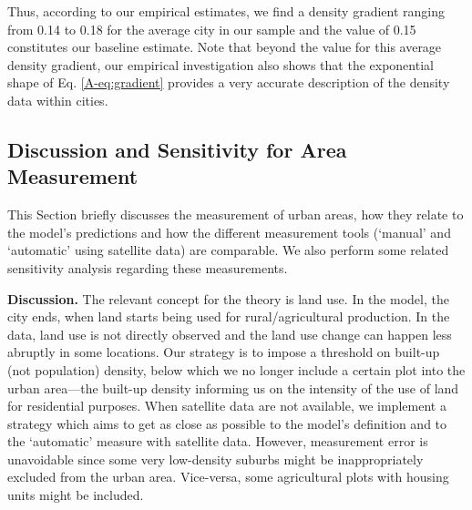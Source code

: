 \documentclass[11pt]{report}
\begin{document}

Thus, according to our empirical estimates, we find a density gradient ranging from 0.14 to 0.18 for the average city in our sample and the value of 0.15 constitutes our baseline estimate. Note that beyond the value for this average density gradient, our empirical investigation also shows that the exponential shape of Eq. \ref{A-eq:gradient} provides a very accurate description of the density data within cities.





\subsection{Discussion and Sensitivity for Area Measurement}\label{A-sec:consistency}

This Section briefly discusses the measurement of urban areas, how they relate to the model's predictions and how the different measurement tools (`manual' and `automatic' using satellite data) are comparable. We also perform some related sensitivity analysis regarding these measurements. 

\textbf{Discussion.} The relevant concept for the theory is land use. In the model, the city ends, when land starts being used for rural/agricultural production. In the data, land use is not directly observed and the land use change can happen less abruptly in some locations. Our strategy is to impose a threshold on built-up (not population) density, below which we no longer include a certain plot into the urban area---the built-up density informing us on the intensity of the use of land for residential purposes. When satellite data are not available, we implement a strategy which aims to get as close as possible to the model's definition and to the `automatic' measure with satellite data. However, measurement error is unavoidable since some very low-density suburbs might be inappropriately excluded from the urban area. Vice-versa, some agricultural plots with housing units might be included. 
\end{document}
